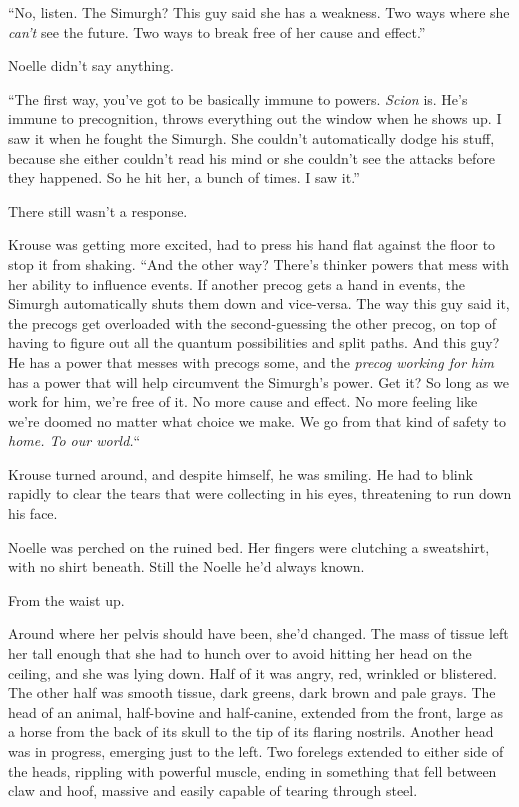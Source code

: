 ``No, listen.  The Simurgh?  This guy said she has a weakness.  Two ways where she \emph{can't} see the future.  Two ways to break free of her cause and effect.''



Noelle didn't say anything.



``The first way, you've got to be basically immune to powers.  \emph{Scion} is.  He's immune to precognition, throws everything out the window when he shows up.  I saw it when he fought the Simurgh.  She couldn't automatically dodge his stuff, because she either couldn't read his mind or she couldn't see the attacks before they happened.  So he hit her, a bunch of times.  I saw it.''



There still wasn't a response.



Krouse was getting more excited, had to press his hand flat against the floor to stop it from shaking.  ``And the other way?  There's thinker powers that mess with her ability to influence events. If another precog gets a hand in events, the Simurgh automatically shuts them down and vice-versa.  The way this guy said it, the precogs get overloaded with the second-guessing the other precog, on top of having to figure out all the quantum possibilities and split paths.  And this guy?  He has a power that messes with precogs some, and the \emph{precog working for him} has a power that will help circumvent the Simurgh's power.  Get it?  So long as we work for him, we're free of it.  No more cause and effect.  No more feeling like we're doomed no matter what choice we make.  We go from that kind of safety to \emph{home.  To our world.}``



Krouse turned around, and despite himself, he was smiling.  He had to blink rapidly to clear the tears that were collecting in his eyes, threatening to run down his face.



Noelle was perched on the ruined bed.  Her fingers were clutching a sweatshirt, with no shirt beneath.  Still the Noelle he'd always known.



From the waist up.



Around where her pelvis should have been, she'd changed.  The mass of tissue left her tall enough that she had to hunch over to avoid hitting her head on the ceiling, and she was lying down.  Half of it was angry, red, wrinkled or blistered.  The other half was smooth tissue, dark greens, dark brown and pale grays.  The head of an animal, half-bovine and half-canine, extended from the front, large as a horse from the back of its skull to the tip of its flaring nostrils.  Another head was in progress, emerging just to the left.  Two forelegs extended to either side of the heads, rippling with powerful muscle, ending in something that fell between claw and hoof, massive and easily capable of tearing through steel.



